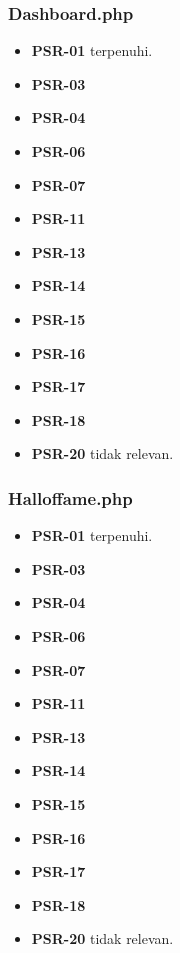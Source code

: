 \subsubsection{Dashboard.php} 
\begin{itemize}
	\item \textbf{PSR-01} terpenuhi.
	\item \textbf{PSR-03}
	\item \textbf{PSR-04}
	\item \textbf{PSR-06}
	\item \textbf{PSR-07}
	\item \textbf{PSR-11}
	\item \textbf{PSR-13}
	\item \textbf{PSR-14}
	\item \textbf{PSR-15}
	\item \textbf{PSR-16}
	\item \textbf{PSR-17} 
	\item \textbf{PSR-18} 
	\item \textbf{PSR-20} tidak relevan.
\end{itemize}

\subsubsection{Halloffame.php}
\begin{itemize}
	\item \textbf{PSR-01} terpenuhi.
	\item \textbf{PSR-03}
	\item \textbf{PSR-04}
	\item \textbf{PSR-06}
	\item \textbf{PSR-07}
	\item \textbf{PSR-11}
	\item \textbf{PSR-13}
	\item \textbf{PSR-14}
	\item \textbf{PSR-15}
	\item \textbf{PSR-16}
	\item \textbf{PSR-17} 
	\item \textbf{PSR-18} 
	\item \textbf{PSR-20} tidak relevan.
\end{itemize}

